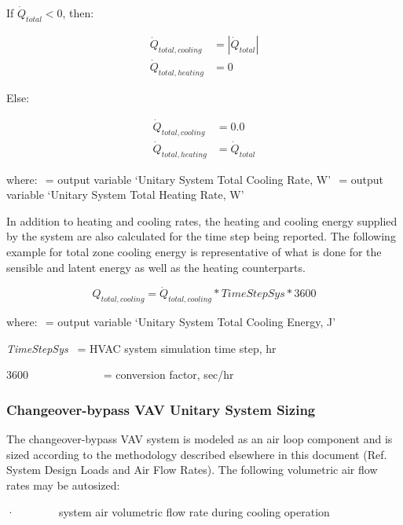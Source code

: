If $\dot{Q}_{total}<0$, then:

\begin{equation}
  \begin{array}{rl}
    \dot{Q}_{total,cooling} &= \left|\dot{Q}_{total}\right| \\
    \dot{Q}_{total,heating} &= 0
  \end{array}
\end{equation}

Else:

\begin{equation} 
  \begin{array}{rl}
    \dot{Q}_{total,cooling} &= 0.0 \\
    \dot{Q}_{total,heating} &= \dot{Q}_{total}
  \end{array}
\end{equation}

where: \(_{ }\) = output variable `Unitary System Total Cooling Rate, W' \(_{ }\) = output variable `Unitary System Total Heating Rate, W'

In addition to heating and cooling rates, the heating and cooling energy supplied by the system are also calculated for the time step being reported. The following example for total zone cooling energy is representative of what is done for the sensible and latent energy as well as the heating counterparts.

\begin{equation}
{Q_{total,cooling}} = {\dot Q_{total,cooling}}*TimeStepSys*3600
\end{equation}

where: \(_{ }\) = output variable `Unitary System Total Cooling Energy, J'

\emph{TimeStepSys}~ = HVAC system simulation time step, hr

3600~~~~~~~~~~~~~ = conversion factor, sec/hr

\subsubsection{Changeover-bypass VAV Unitary System Sizing}\label{changeover-bypass-vav-unitary-system-sizing}

The changeover-bypass VAV system is modeled as an air loop component and is sized according to the methodology described elsewhere in this document (Ref. System Design Loads and Air Flow Rates). The following volumetric air flow rates may be autosized:

·~~~~~~~~system air volumetric flow rate during cooling operation

